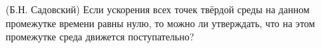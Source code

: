 (Б.Н. Садовский)
Если ускорения всех точек твёрдой среды на данном промежутке времени
равны нулю, то можно ли утверждать, что на этом промежутке среда
движется поступательно?
